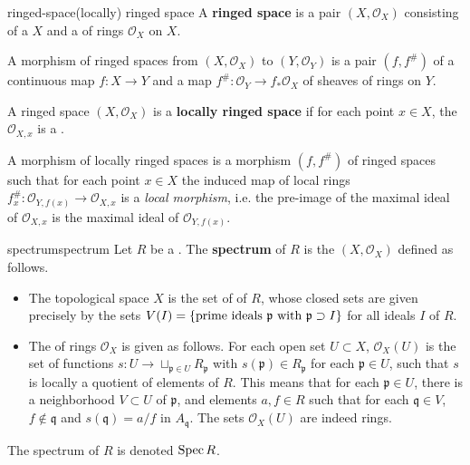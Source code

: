 \begin{topic}{ringed-space}{(locally) ringed space}
    A \textbf{ringed space} is a pair $(X, \mathcal{O}_X)$ consisting of a  $X$ and a  of rings $\mathcal{O}_X$ on $X$.
    
    A morphism of ringed spaces from $(X, \mathcal{O}_X)$ to $(Y, \mathcal{O}_Y)$ is a pair $(f, f^\#)$ of a continuous map $f : X \to Y$ and a map $f^\# : \mathcal{O}_Y \to f_* \mathcal{O}_X$ of sheaves of rings on $Y$.
    
    A ringed space $(X, \mathcal{O}_X)$ is a \textbf{locally ringed space} if for each point $x \in X$, the  $\mathcal{O}_{X,x}$ is a .
    
    A morphism of locally ringed spaces is a morphism $(f, f^\#)$ of ringed spaces such that for each point $x \in X$ the induced map of local rings $f^\#_x : \mathcal{O}_{Y, f(x)} \to \mathcal{O}_{X, x}$ is a \textit{local morphism}, i.e. the pre-image of the maximal ideal of $\mathcal{O}_{X, x}$ is the maximal ideal of $\mathcal{O}_{Y, f(x)}$.
\end{topic}

\begin{topic}{spectrum}{spectrum}
    Let $R$ be a . The \textbf{spectrum} of $R$ is the  $(X, \mathcal{O}_X)$ defined as follows.
    \begin{itemize}
        \item The topological space $X$ is the set of  of $R$, whose closed sets are given precisely by the sets $V(I) = \{ \textup{prime ideals } \mathfrak{p} \text{ with } \mathfrak{p} \supset I \}$ for all ideals $I$ of $R$.
        
        \item The  of rings $\mathcal{O}_X$ is given as follows. For each open set $U \subset X$, $\mathcal{O}_X(U)$ is the set of functions $s : U \to \sqcup_{\mathfrak{p} \in U} R_\mathfrak{p}$ with $s(\mathfrak{p}) \in R_\mathfrak{p}$ for each $\mathfrak{p} \in U$, such that $s$ is locally a quotient of elements of $R$. This means that for each $\mathfrak{p} \in U$, there is a neighborhood $V \subset U$ of $\mathfrak{p}$, and elements $a, f \in R$ such that for each $\mathfrak{q} \in V$, $f \not\in \mathfrak{q}$ and $s(\mathfrak{q}) = a/f$ in $A_\mathfrak{q}$. The sets $\mathcal{O}_X(U)$ are indeed rings.
    \end{itemize}
    The spectrum of $R$ is denoted $\operatorname{Spec} R$.
\end{topic}

